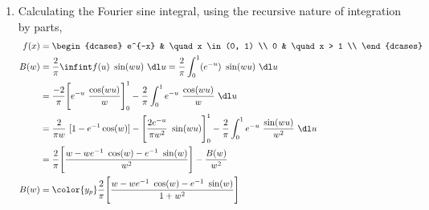 \begin{enumerate}
    \item Calculating the Fourier sine integral, using the recursive nature of
          integration by parts,
          \begin{align}
              f(x) & = \begin{dcases}
                           e^{-x} & \quad x \in (0, 1) \\
                           0      & \quad x > 1        \\
                       \end{dcases}                                 \\
              B(w) & = \frac{2}{\pi} \infint f(u)\ \sin(wu)\ \dl u
              = \frac{2}{\pi} \int_{0}^{1} (e^{-u})\ \sin(wu)\ \dl u               \\
                   & = \frac{-2}{\pi} \Bigg[ e^{-u}\ \frac{\cos(wu)}{w} \Bigg]_0^1
              - \frac{2}{\pi}\int_{0}^{1} e^{-u}\ \frac{\cos(wu)}{w}\ \dl u        \\
                   & = \frac{2}{\pi w}\ [1 - e^{-1} \cos(w)]
              - \Bigg[ \frac{2e^{-u}}{\pi w^2}\ \sin(wu) \Bigg]_0^1
              - \frac{2}{\pi}\int_{0}^{1} e^{-u}\ \frac{\sin(wu)}{w^2}\ \dl u      \\
                   & = \frac{2}{\pi}\Bigg[\frac{w - we^{-1}\ \cos(w)
              - e^{-1}\ \sin(w)}{w^2}\Bigg] - \frac{B(w)}{w^2}                     \\
              B(w) & = \color{y_p} \frac{2}{\pi}\Bigg[\frac{w - we^{-1}\ \cos(w)
                      - e^{-1}\ \sin(w)}{1 + w^2}\Bigg]
          \end{align}




\end{enumerate}
